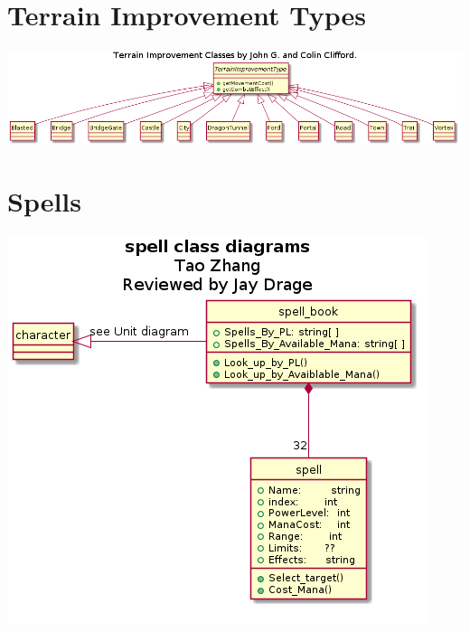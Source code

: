 \documentclass{article}
\begin{document}
\section{Terrain Improvement Types}
\includegraphics[width=\textwidth]{pngs/TerrainImprovementClasses.png}


\section{Spells}
\includegraphics[width=\textwidth]{pngs/spell.png}
\end{document}
